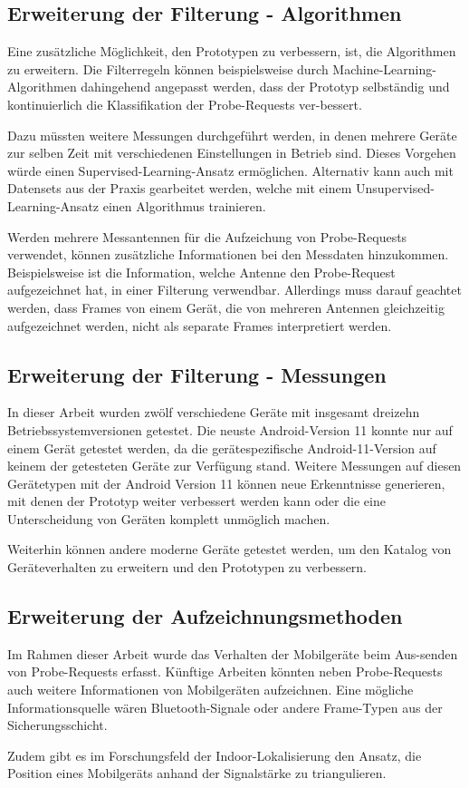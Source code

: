 \subsection{Erweiterung der Filterung - Algorithmen}
Eine zusätzliche Möglichkeit, den Prototypen zu verbessern, ist, die 
Algorithmen zu erweitern. Die Filterregeln können beispielsweise durch 
Machine-Learning-Algorithmen dahingehend angepasst werden, dass der 
Prototyp selbständig und kontinuierlich die Klassifikation der Probe-Requests 
ver-bessert.

Dazu müssten weitere Messungen durchgeführt werden, in denen mehrere Geräte 
zur selben Zeit mit verschiedenen Einstellungen in Betrieb sind. 
Dieses Vorgehen würde einen Supervised-Learning-Ansatz ermöglichen.
Alternativ kann auch mit Datensets aus der Praxis gearbeitet werden, 
welche mit einem Unsupervised-Learning-Ansatz einen Algorithmus trainieren.

Werden mehrere Messantennen für die Aufzeichung von Probe-Requests verwendet,
können zusätzliche Informationen bei den Messdaten hinzukommen. 
Beispielsweise ist die Information, welche Antenne den Probe-Request aufgezeichnet
hat, in einer Filterung verwendbar. Allerdings muss darauf geachtet werden, 
dass Frames von einem Gerät, die von mehreren Antennen gleichzeitig aufgezeichnet 
werden, nicht als separate Frames interpretiert werden.

\subsection{Erweiterung der Filterung - Messungen}
In dieser Arbeit wurden zwölf verschiedene Geräte mit insgesamt dreizehn 
Betriebssystemversionen getestet. Die neuste Android-Version 11 konnte nur
auf einem Gerät getestet werden, da die gerätespezifische Android-11-Version 
auf keinem der getesteten Geräte zur Verfügung stand. Weitere Messungen auf 
diesen Gerätetypen mit der Android Version 11 können neue Erkenntnisse 
generieren, mit denen der Prototyp weiter verbessert werden kann oder 
die eine Unterscheidung von Geräten komplett unmöglich machen.

Weiterhin können andere moderne Geräte getestet werden, um den Katalog von 
Geräteverhalten zu erweitern und den Prototypen zu verbessern.

\subsection{Erweiterung der Aufzeichnungsmethoden}
Im Rahmen dieser Arbeit wurde das Verhalten der Mobilgeräte beim Aus-senden 
von Probe-Requests erfasst. Künftige Arbeiten könnten neben Probe-Requests auch 
weitere Informationen von Mobilgeräten aufzeichnen. Eine mögliche Informationsquelle
wären Bluetooth-Signale oder andere Frame-Typen aus der Sicherungsschicht.

Zudem gibt es im Forschungsfeld der Indoor-Lokalisierung den Ansatz, die 
Position eines Mobilgeräts anhand der Signalstärke zu triangulieren.

\clearpage